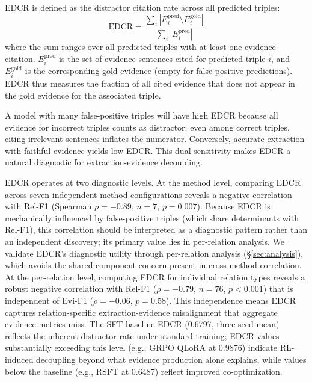 EDCR is defined as the distractor citation rate across all predicted triples:
\begin{equation}
\text{EDCR} = \frac{\sum_{i} |E_i^{\text{pred}} \setminus E_i^{\text{gold}}|}{\sum_{i} |E_i^{\text{pred}}|}
\label{eq:edcr}
\end{equation}
where the sum ranges over all predicted triples with at least one evidence citation. $E_i^{\text{pred}}$ is the set of evidence sentences cited for predicted triple $i$, and $E_i^{\text{gold}}$ is the corresponding gold evidence (empty for false-positive predictions). EDCR thus measures the fraction of all cited evidence that does not appear in the gold evidence for the associated triple.

A model with many false-positive triples will have high EDCR because all evidence for incorrect triples counts as distractor; even among correct triples, citing irrelevant sentences inflates the numerator. Conversely, accurate extraction with faithful evidence yields low EDCR. This dual sensitivity makes EDCR a natural diagnostic for extraction-evidence decoupling.

EDCR operates at two diagnostic levels. At the method level, comparing EDCR across seven independent method configurations reveals a negative correlation with Rel-F1 (Spearman $\rho{=}{-}0.89$, $n{=}7$, $p{=}0.007$). Because EDCR is mechanically influenced by false-positive triples (which share determinants with Rel-F1), this correlation should be interpreted as a diagnostic pattern rather than an independent discovery; its primary value lies in per-relation analysis. We validate EDCR's diagnostic utility through per-relation analysis (\S\ref{sec:analysis}), which avoids the shared-component concern present in cross-method correlation. At the per-relation level, computing EDCR for individual relation types reveals a robust negative correlation with Rel-F1 ($\rho{=}{-}0.79$, $n{=}76$, $p{<}0.001$) that is independent of Evi-F1 ($\rho{=}{-}0.06$, $p{=}0.58$). This independence means EDCR captures relation-specific extraction-evidence misalignment that aggregate evidence metrics miss. The SFT baseline EDCR (0.6797, three-seed mean) reflects the inherent distractor rate under standard training; EDCR values substantially exceeding this level (e.g., GRPO QLoRA at 0.9876) indicate RL-induced decoupling beyond what evidence production alone explains, while values below the baseline (e.g., RSFT at 0.6487) reflect improved co-optimization.

